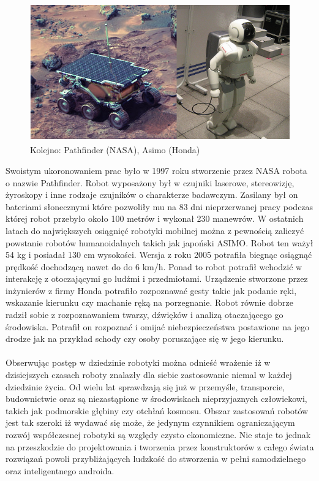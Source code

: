 \begin{figure}[hb]
 \centering
 \includegraphics[height=60mm]{../images/ch01/pathfinder_and_asimo.png}
 \caption{Kolejno: Pathfinder (NASA), Asimo (Honda)}
 \label{fig:RobotsHistory_Pathfinder_Asimo}
\end{figure}

Swoistym ukoronowaniem prac było w 1997 roku stworzenie przez NASA robota o
nazwie Pathfinder. Robot wyposażony był w czujniki laserowe, stereowizję,
żyroskopy i inne rodzaje czujników o charakterze badawczym. Zasilany był on
bateriami słonecznymi które pozwoliły mu na 83 dni nieprzerwanej pracy podczas
której robot przebyło około 100 metrów i wykonał 230 manewrów. W ostatnich
latach do największych osiągnięć robotyki mobilnej można z pewnością zaliczyć
powstanie robotów humanoidalnych takich jak japoński ASIMO. Robot ten ważył 54
kg i posiadał 130 cm wysokości. Wersja z roku 2005 potrafiła biegnąc osiągnąć
prędkość dochodzącą nawet do do 6 km/h. Ponad to robot potrafił wchodzić w
interakcję z otoczającymi go ludźmi i przedmiotami. Urządzenie stworzone przez
inżynierów z firmy Honda potrafiło rozpoznawać gesty takie jak podanie ręki,
wskazanie kierunku czy machanie ręką na porzegnanie. Robot równie dobrze radził
sobie z rozpoznawaniem twarzy, dźwięków i analizą otaczającego go środowiska.
Potrafił on rozpoznać i omijać niebezpieczeństwa postawione na jego drodze jak
na przykład schody czy osoby poruszające się w jego kierunku.\\
\\
Obserwując postęp w dziedzinie robotyki można odnieść wrażenie iż w dzisiejszych
czasach roboty znalazły dla siebie zastosowanie niemal w każdej dziedzinie
życia. Od wielu lat sprawdzają się już w przemyśle, transporcie, budownictwie
oraz są niezastąpione w środowiskach nieprzyjaznych człowiekowi, takich jak
podmorskie głębiny czy otchłań kosmosu. Obszar zastosowań robotów jest
tak szeroki iż wydawać się może, że jedynym czynnikiem ograniczającym rozwój
współczesnej robotyki są względy czysto ekonomiczne. Nie staje to jednak na
przeszkodzie do projektowania i tworzenia przez konstruktorów z całego świata
rozwiązań powoli przybliżających ludzkość do stworzenia w pełni samodzielnego
oraz inteligentnego androida.
